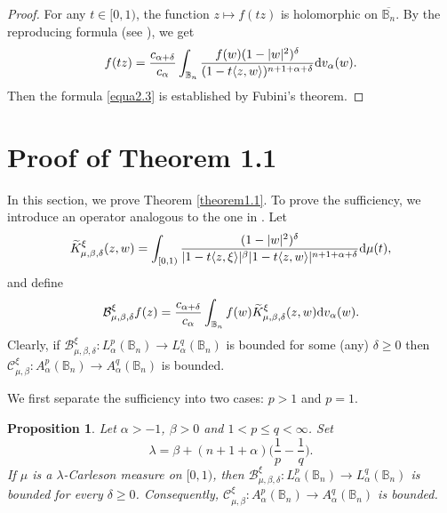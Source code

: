 \documentclass[preprint,12pt,times]{elsarticle}
\newtheorem{proposition}[theorem]{Proposition}
\theoremstyle{definition}
\theoremstyle{remark}
\numberwithin{equation}{section}
\begin{document}
\begin{proof}
For any $t\in [0,1)$, the function $z\mapsto f(tz)$ is holomorphic on $\overline{\mathbb{B}_n}$. By the reproducing formula (see \cite[Theorem 2.2]{Zhu2005}), we get
\[
    f(tz)=\frac{c_{\alpha+\delta}}{c_{\alpha}}\int_{\mathbb{B}_n}\frac{f(w)(1-|w|^2)^{\delta}}{(1-t\langle z,w\rangle)^{n+1+\alpha+\delta}}{\rm d}v_{\alpha}(w).
\]
Then the formula \eqref{equa2.3} is established by Fubini's theorem.
\end{proof}


\section{Proof of Theorem 1.1}

 In this section, we prove Theorem \ref{theorem1.1}. To prove the sufficiency, we introduce an operator analogous to the one in \cite{GSZ2025}. Let 
\[
    \widetilde{K}_{\mu,\beta,\delta}^{\xi}(z,w)=\int_{[0,1)}\frac{(1-|w|^2)^{\delta}}{|1-t\langle z,\xi\rangle|^{\beta}|1-t\langle z,w\rangle|^{n+1+\alpha+\delta}}{\rm d}\mu(t),
\]
and define
\begin{equation}\label{equa3.01}
\mathcal{B}_{\mu,\beta,\delta}^{\xi}f(z)=\frac{c_{\alpha+\delta}}{c_{\alpha}}\int_{\mathbb{B}_n}f(w)\widetilde{K}_{\mu,\beta,\delta}^{\xi}(z,w){\rm d}v_{\alpha}(w).
\end{equation}
Clearly, if $\mathcal{B}_{\mu,\beta,\delta}^{\xi}: L_{\alpha}^p(\mathbb{B}_n)\to L_{\alpha}^q(\mathbb{B}_n)$ is bounded for some (any) $\delta\geq 0$ then $\mathcal{C}_{\mu,\beta}^\xi: A_{\alpha}^p(\mathbb{B}_n)\to A_{\alpha}^q(\mathbb{B}_n)$ is bounded.


We first separate the sufficiency into two cases: $p>1$ and $p=1$.
\begin{proposition}\label{proposition3.1}
Let $\alpha>-1$, $\beta>0$ and $1<p\leq q<\infty$. Set 
\[
    \lambda=\beta+(n+1+\alpha)\Big(\frac{1}{p}-\frac{1}{q}\Big).
\]
If $\mu$ is a $\lambda$-Carleson measure on $[0,1)$, then $\mathcal{B}_{\mu,\beta,\delta}^{\xi}: L_{\alpha}^p(\mathbb{B}_n)\to L_{\alpha}^q(\mathbb{B}_n)$ is bounded for every $\delta\geq 0$. Consequently, $\mathcal{C}_{\mu,\beta}^{\xi}: A_{\alpha}^p(\mathbb{B}_n)\to A_{\alpha}^q(\mathbb{B}_n)$ is bounded.
\end{proposition}
\end{document}
